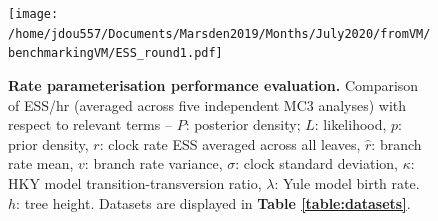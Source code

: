 \documentclass[10pt,letterpaper]{article}
\begin{document}











\begin{figure}[!h]
\texttt{[image: /home/jdou557/Documents/Marsden2019/Months/July2020/fromVM/benchmarkingVM/ESS\_round1.pdf]}
\caption{\textbf{Rate parameterisation performance evaluation.} Comparison of ESS/hr (averaged across five independent MC3 analyses) with respect to relevant terms -- $P$: posterior density; $L$: likelihood, $p$: prior density, $r$: clock rate ESS averaged across all leaves, $\hat{r}$: branch rate mean, $v$: branch rate variance, $\sigma$: clock standard deviation, $\kappa$: HKY model transition-transversion ratio, $\lambda$: Yule model birth rate. $h$: tree height. Datasets are displayed in \textbf{Table \ref{table:datasets}}.  }
\label{fig:parameterisationResults}
\end{figure}




\end{document}
